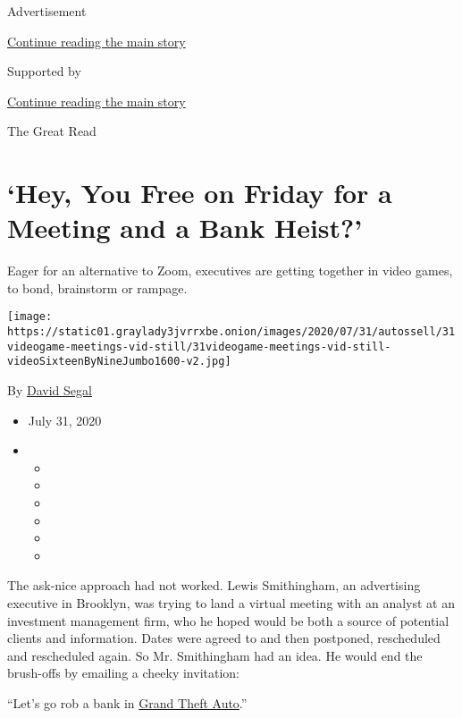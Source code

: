 Advertisement

\protect\hyperlink{after-top}{Continue reading the main story}

Supported by

\protect\hyperlink{after-sponsor}{Continue reading the main story}

The Great Read

\hypertarget{hey-you-free-on-friday-for-a-meeting-and-a-bank-heist}{%
\section{`Hey, You Free on Friday for a Meeting and a Bank
Heist?'}\label{hey-you-free-on-friday-for-a-meeting-and-a-bank-heist}}

Eager for an alternative to Zoom, executives are getting together in
video games, to bond, brainstorm or rampage.

\texttt{[image: https://static01.graylady3jvrrxbe.onion/images/2020/07/31/autossell/31videogame-meetings-vid-still/31videogame-meetings-vid-still-videoSixteenByNineJumbo1600-v2.jpg]}

By \href{https://www.nytimes3xbfgragh.onion/by/david-segal}{David Segal}

\begin{itemize}
\item
  July 31, 2020
\item
  \begin{itemize}
  \item
  \item
  \item
  \item
  \item
  \item
  \end{itemize}
\end{itemize}

The ask-nice approach had not worked. Lewis Smithingham, an advertising
executive in Brooklyn, was trying to land a virtual meeting with an
analyst at an investment management firm, who he hoped would be both a
source of potential clients and information. Dates were agreed to and
then postponed, rescheduled and rescheduled again. So Mr. Smithingham
had an idea. He would end the brush-offs by emailing a cheeky
invitation:

``Let's go rob a bank in
\href{https://www.nytimes3xbfgragh.onion/2013/09/17/arts/video-games/grand-theft-auto-v-is-a-return-to-the-comedy-of-violence.html}{Grand
Theft Auto}.''

